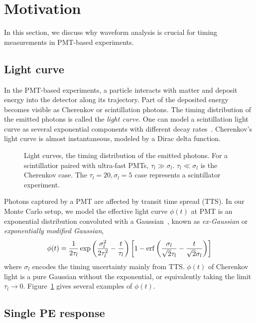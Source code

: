 \section{Motivation}
\label{sec:toyMC}

In this section, we discuss why waveform analysis is crucial for timing measurements in PMT-based experiments. 

\subsection{Light curve}
In the PMT-based experiments, a particle interacts with matter and deposit energy into the detector along its trajectory. Part of the deposited energy becomes visible as Cherenkov or scintillation photons. The timing distribution of the emitted photons is called the \textit{light curve}. One can model a scintillation light curve as several exponential components with different decay rates~\cite{rebber_particle_2021}. Cherenkov's light curve is almost instantaneous, modeled by a Dirac delta function. 

\begin{figure}[!htb]
  \centering
  \resizebox{0.5\textwidth}{!}{}
  \caption{\label{fig:time-pro} Light curves, the timing distribution of the emitted photons. For a scintillatior paired with ultra-fast PMTs, $\tau_l \gg \sigma_l$. $\tau_l \ll \sigma_l$ is the Cherenkov case. The $\tau_l=20, \sigma_l=5$ case represents a scintillator experiment. }
\end{figure}

Photons captured by a PMT are affected by transit time spread (TTS). In our Monte Carlo setup, we model the effective light curve $\phi(t)$ at PMT is an exponential distribution convoluted with a Gaussian~\cite{li_separation_2016}, known as \textit{ex-Gaussian} or \textit{exponentially modified Gaussian}, 
\begin{align}
    \phi(t) = \frac{1}{2\tau_l} \exp\left(\frac{\sigma_l^2}{2\tau_l^2}-\frac{t}{\tau_l}\right) \left[1 - \operatorname{erf}\left( \frac{\sigma_l}{\sqrt{2}\tau_l} - \frac{t}{\sqrt{2}\sigma_l} \right)\right]
    \label{eq:time-pro}
\end{align}
where $\sigma_l$ encodes the timing uncertainty mainly from TTS. $\phi(t)$ of Cherenkov light is a pure Gaussian without the exponential, or equivalently taking the limit $\tau_l \rightarrow 0$. Figure~\ref{fig:time-pro} gives several examples of $\phi(t)$.

\subsection{Single PE response}
\label{subsec:spe}

